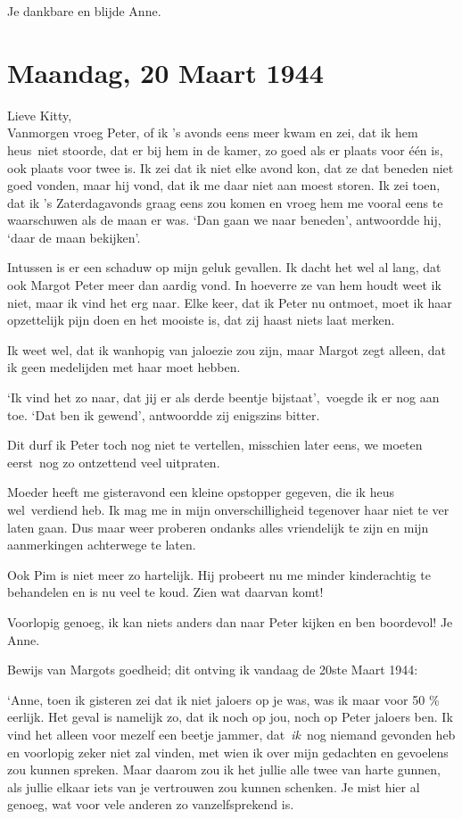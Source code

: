 \documentclass{book}
\begin{document}
Je dankbare en blijde Anne.

\chapter{Maandag, 20 Maart 1944}

Lieve Kitty,\\Vanmorgen vroeg Peter, of ik 's avonds eens meer kwam en
zei, dat ik hem heus~niet stoorde, dat er bij hem in de kamer, zo goed
als er plaats voor één is, ook plaats voor twee is. Ik zei dat ik niet
elke avond kon, dat ze dat beneden niet goed vonden, maar hij vond, dat
ik me daar niet aan moest storen. Ik zei toen, dat ik 's Zaterdagavonds
graag eens zou komen en vroeg hem me vooral eens te waarschuwen als de
maan er was. `Dan gaan we naar beneden', antwoordde hij, `daar de maan
bekijken'.

Intussen is er een schaduw op mijn geluk gevallen. Ik dacht het wel al
lang, dat ook Margot Peter meer dan aardig vond. In hoeverre ze van hem
houdt weet ik niet, maar ik vind het erg naar. Elke keer, dat ik Peter
nu ontmoet, moet ik haar opzettelijk pijn doen en het mooiste is, dat
zij haast niets laat merken.

Ik weet wel, dat ik wanhopig van jaloezie zou zijn, maar Margot zegt
alleen, dat ik geen medelijden met haar moet hebben.

`Ik vind het zo naar, dat jij er als derde beentje bijstaat',~voegde ik
er nog aan toe. `Dat ben ik gewend', antwoordde zij enigszins bitter.

Dit durf ik Peter toch nog niet te vertellen, misschien later eens, we
moeten eerst~nog zo ontzettend veel uitpraten.

Moeder heeft me gisteravond een kleine opstopper gegeven, die ik heus
wel~verdiend heb. Ik mag me in mijn onverschilligheid tegenover haar
niet te ver laten gaan. Dus maar weer proberen ondanks alles vriendelijk
te zijn en mijn aanmerkingen achterwege te laten.

Ook Pim is niet meer zo hartelijk. Hij probeert nu me minder
kinderachtig te behandelen en is nu veel te koud. Zien wat daarvan komt!

Voorlopig genoeg, ik kan niets anders dan naar Peter kijken en ben
boordevol! Je Anne.

Bewijs van Margots goedheid; dit ontving ik vandaag de 20ste Maart 1944:

`Anne, toen ik gisteren zei dat ik niet jaloers op je was, was ik maar
voor 50 \% eerlijk. Het geval is namelijk zo, dat ik noch op jou, noch
op Peter jaloers ben. Ik vind het alleen voor mezelf een beetje jammer,
dat~\emph{ik}~nog niemand gevonden heb en voorlopig zeker niet zal
vinden, met wien ik over mijn gedachten en gevoelens zou kunnen spreken.
Maar daarom zou ik het jullie alle twee van harte gunnen, als jullie
elkaar iets van je vertrouwen zou kunnen schenken. Je mist hier al
genoeg, wat voor vele anderen zo vanzelfsprekend is.
\end{document}
